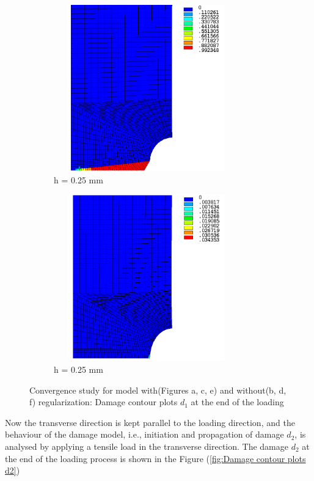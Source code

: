\documentclass[12pt,a4paper,twoside,openright]{report}
\begin{document}
\begin{figure}[htbp!]\ContinuedFloat
     \begin{subfigure}{0.4\textwidth}
         \includegraphics[width=8cm,height=7.2cm,keepaspectratio]{25.d1-0.25-r.png}
         \caption{h = 0.25 mm}
         \label{fig:d1-0.25-r}
     \end{subfigure}
     \hspace{1.8cm}
     \begin{subfigure}{0.4\textwidth}
         \includegraphics[width=8cm,height=7.2cm,keepaspectratio]{25.d1-0.25-nr.png}
         \caption{h = 0.25 mm}
         \label{fig:d1-0.25-nr}
     \end{subfigure}     
        \caption{Convergence study for model with(Figures a, c, e) and without(b, d, f) regularization: Damage contour plots $d_{1}$ at the end of the loading}
        \label{fig:Convergence study for model with and without regularization}     
\end{figure}
\FloatBarrier
Now the transverse direction is kept parallel to the loading direction, and the behaviour of the damage model, i.e., initiation and propagation of damage $d_{2}$, is analysed by applying a tensile load in the transverse direction. The damage $d_{2}$ at the end of the loading process is shown in the Figure (\ref{fig:Damage contour plots d2})
\end{document}
